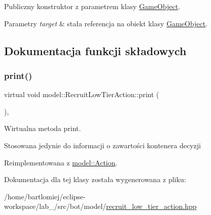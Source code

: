 Publiczny konstruktor z parametrem klasy \hyperlink{classmodel_1_1GameObject}{Game\+Object}. 


\begin{DoxyParams}{Parametry}
{\em target} & stała referencja na obiekt klasy \hyperlink{classmodel_1_1GameObject}{Game\+Object}. \\
\hline
\end{DoxyParams}


\subsection{Dokumentacja funkcji składowych}
\mbox{\label{classmodel_1_1RecruitLowTierAction_ac05d2ba4872e6b06bf3a218661a4abdc}} 
\subsubsection{\texorpdfstring{print()}{print()}}
{\footnotesize\ttfamily virtual void model\+::\+Recruit\+Low\+Tier\+Action\+::print (\begin{DoxyParamCaption}{ }\end{DoxyParamCaption})\hspace{0.3cm}{\ttfamily [inline]}, {\ttfamily [virtual]}}



Wirtualna metoda print. 

Stosowana jedynie do informacji o zawartości kontenera decyzji 

Reimplementowana z \hyperlink{classmodel_1_1Action_a2955dbb4a69e38a48aa07d730fe2d77c}{model\+::\+Action}.



Dokumentacja dla tej klasy została wygenerowana z pliku\+:\begin{DoxyCompactItemize}
\item 
/home/bartlomiej/eclipse-\/workspace/lab\+\_/src/bot/model/\hyperlink{recruit__low__tier__action_8hpp}{recruit\+\_\+low\+\_\+tier\+\_\+action.\+hpp}\end{DoxyCompactItemize}
